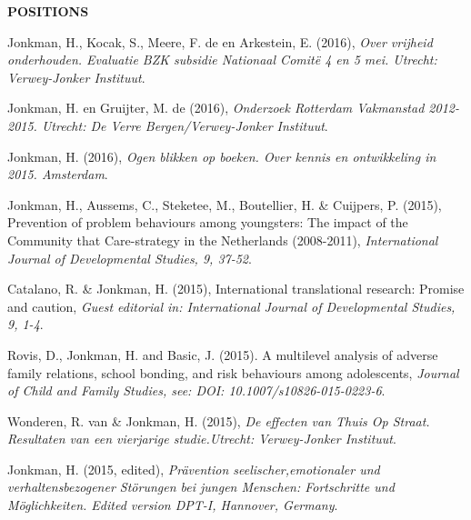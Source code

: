 \documentclass[
  16,
]{article}
\begin{document}
\begin{large}{\bf POSITIONS}
\vspace{3pt}

Jonkman, H., Kocak, S., Meere, F. de en Arkestein, E. (2016),
\emph{Over vrijheid onderhouden. Evaluatie BZK subsidie Nationaal Comitë 4 en 5 mei. Utrecht: Verwey-Jonker Instituut}.

\vspace{3pt}

Jonkman, H. en Gruijter, M. de (2016),
\emph{Onderzoek Rotterdam Vakmanstad 2012-2015. Utrecht: De Verre Bergen/Verwey-Jonker Instituut}.

\vspace{3pt}

Jonkman, H. (2016),
\emph{Ogen blikken op boeken. Over kennis en ontwikkeling in 2015. Amsterdam}.

\vspace{3pt}

Jonkman, H., Aussems, C., Steketee, M., Boutellier, H. \& Cuijpers, P.
(2015), Prevention of problem behaviours among youngsters: The impact of
the Community that Care-strategy in the Netherlands (2008-2011),
\emph{International Journal of Developmental Studies, 9, 37-52}.

\vspace{3pt}

Catalano, R. \& Jonkman, H. (2015), International translational
research: Promise and caution,
\emph{Guest editorial in: International Journal of Developmental Studies, 9, 1-4}.

\vspace{3pt}

Rovis, D., Jonkman, H. and Basic, J. (2015). A multilevel analysis of
adverse family relations, school bonding, and risk behaviours among
adolescents,
\emph{Journal of Child and Family Studies, see: DOI: 10.1007/s10826-015-0223-6}.

\vspace{3pt}

Wonderen, R. van \& Jonkman, H. (2015),
\emph{De effecten van Thuis Op Straat. Resultaten van een vierjarige studie.Utrecht: Verwey-Jonker Instituut}.

\vspace{3pt}

Jonkman, H. (2015, edited),
\emph{Prävention seelischer,emotionaler und verhaltensbezogener Störungen bei jungen Menschen: Fortschritte und Möglichkeiten. Edited version DPT-I, Hannover, Germany}.

\vspace{3pt}


\end{large}
\end{document}
